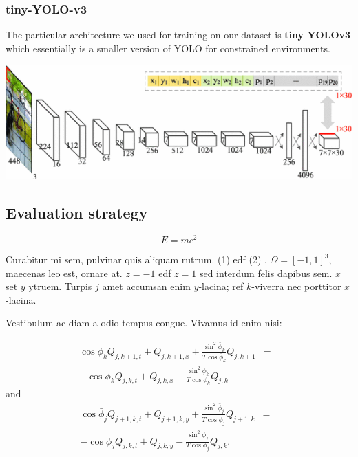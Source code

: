 \documentclass[a0,landscape]{a0poster}
\begin{document}
\begin{multicols}{3}
\subsubsection*{tiny-YOLO-v3}

The particular architecture we used for training on our dataset is \textbf{tiny YOLOv3} which essentially is a smaller version of YOLO for constrained environments.
\begin{center}\vspace{1cm}
\includegraphics[width=0.9\linewidth]{tinyyolo}
\end{center}\vspace{1cm}
\subsection*{Evaluation strategy}
\begin{equation}
E = mc^{2}
\label{eqn:Einstein}
\end{equation}

Curabitur mi sem, pulvinar quis aliquam rutrum. (1) edf (2)
, $\Omega=[-1,1]^3$, maecenas leo est, ornare at. $z=-1$ edf $z=1$ sed interdum felis dapibus sem. $x$ set $y$ ytruem. 
Turpis $j$ amet accumsan enim $y$-lacina; 
ref $k$-viverra nec porttitor $x$-lacina. 

Vestibulum ac diam a odio tempus congue. Vivamus id enim nisi:

\begin{eqnarray}
\cos\bar{\phi}_k Q_{j,k+1,t} + Q_{j,k+1,x}+\frac{\sin^2\bar{\phi}_k}{T\cos\bar{\phi}_k} Q_{j,k+1} &=&\nonumber\\ 
-\cos\phi_k Q_{j,k,t} + Q_{j,k,x}-\frac{\sin^2\phi_k}{T\cos\phi_k} Q_{j,k}\label{edgek}
\end{eqnarray}
and
\begin{eqnarray}
\cos\bar{\phi}_j Q_{j+1,k,t} + Q_{j+1,k,y}+\frac{\sin^2\bar{\phi}_j}{T\cos\bar{\phi}_j} Q_{j+1,k}&=&\nonumber \\
-\cos\phi_j Q_{j,k,t} + Q_{j,k,y}-\frac{\sin^2\phi_j}{T\cos\phi_j} Q_{j,k}.\label{edgej}
\end{eqnarray} 



\end{multicols}
\end{document}
